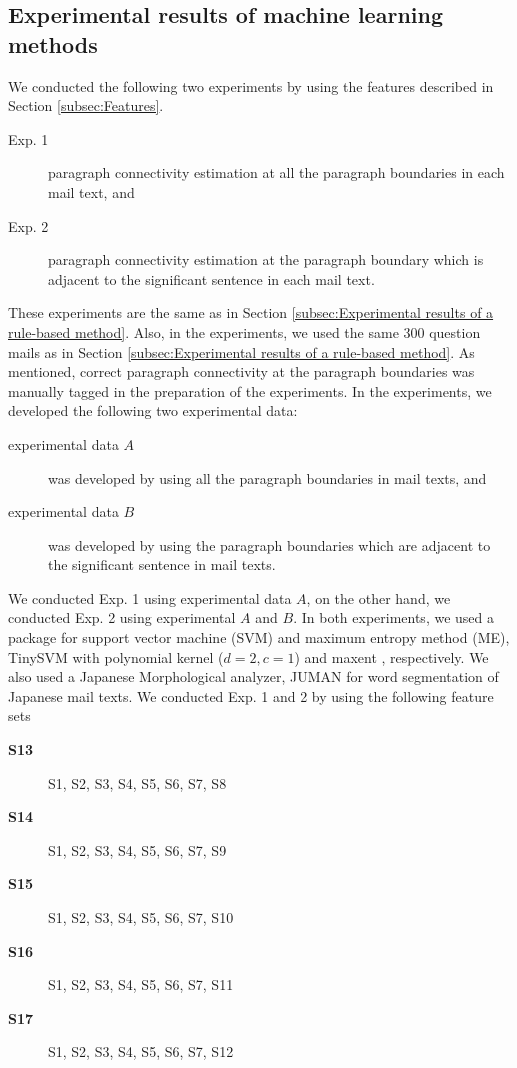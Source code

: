 \documentclass[english]{jnlp_1.4}
\begin{document}
\subsection{Experimental results of machine learning methods}
\label{subsec:Experimental results of machine learning methods}

We conducted the following two experiments 
by using the features described in Section \ref{subsec:Features}.
\begin{description}
 \item[Exp. 1] paragraph connectivity estimation 
	    at all the paragraph boundaries in each mail text, and 
	    
 \item[Exp. 2] paragraph connectivity estimation 
	    at the paragraph boundary
	    which is adjacent to the significant sentence in each mail text.
\end{description}
These experiments are the same as 
in Section \ref{subsec:Experimental results of a rule-based method}.
Also, in the experiments, 
we used the same 300 question mails as 
in Section \ref{subsec:Experimental results of a rule-based method}.
As mentioned, 
correct paragraph connectivity at the paragraph boundaries was
manually tagged in the preparation of the experiments.
In the experiments, 
we developed the following two experimental data:
\begin{description}
 \item[experimental data $A$] was developed 
	    by using all the paragraph boundaries in mail texts, and

 \item[experimental data $B$] was developed 
	    by using the paragraph boundaries
	    which are adjacent to the significant sentence in mail texts.
\end{description}
We conducted Exp. 1 using experimental data $A$, 
on the other hand, 
we conducted Exp. 2 using experimental $A$ and $B$.
In both experiments, 
we used a package for 
support vector machine (SVM) and 
maximum entropy method (ME),  
TinySVM \cite{soft:kudoh2002} with polynomial kernel ($d = 2, c = 1$) and 
maxent \cite{soft:utiyama2008}, respectively.
We also used a Japanese Morphological analyzer, JUMAN 
for word segmentation of Japanese mail texts. 
We conducted Exp. 1 and 2 
by using the following feature sets 
\begin{description}
 \item[\bf{S13}] S1, S2, S3, S4, S5, S6, S7, S8
 \item[\bf{S14}] S1, S2, S3, S4, S5, S6, S7, S9
 \item[\bf{S15}] S1, S2, S3, S4, S5, S6, S7, S10
 \item[\bf{S16}] S1, S2, S3, S4, S5, S6, S7, S11
 \item[\bf{S17}] S1, S2, S3, S4, S5, S6, S7, S12
\end{description}
\end{document}

